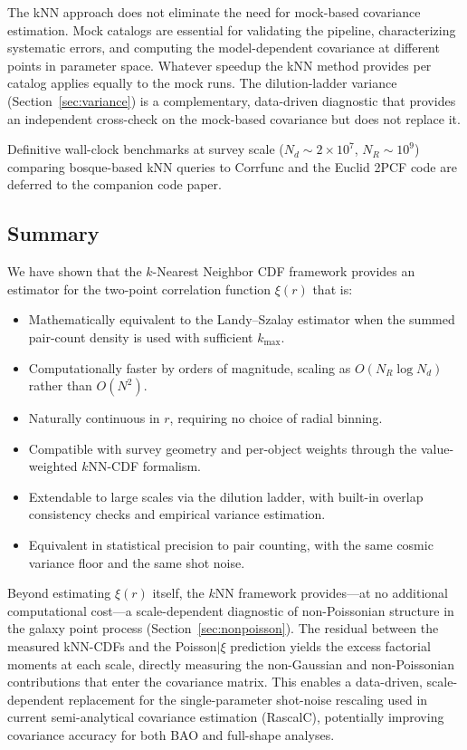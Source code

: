 The kNN approach does not eliminate the need for mock-based covariance estimation.  Mock catalogs are essential for validating the pipeline, characterizing systematic errors, and computing the model-dependent covariance at different points in parameter space.  Whatever speedup the kNN method provides per catalog applies equally to the mock runs.  The dilution-ladder variance (Section~\ref{sec:variance}) is a complementary, data-driven diagnostic that provides an independent cross-check on the mock-based covariance but does not replace it.

Definitive wall-clock benchmarks at survey scale ($N_d \sim 2 \times 10^7$, $N_R \sim 10^9$) comparing bosque-based kNN queries to Corrfunc and the Euclid 2PCF code are deferred to the companion code paper.

\subsection{Summary}
\label{sec:summary_final}

We have shown that the $k$-Nearest Neighbor CDF framework provides an estimator for the two-point correlation function $\xi(r)$ that is:
\begin{itemize}[nosep]
  \item Mathematically equivalent to the Landy--Szalay estimator when the summed pair-count density is used with sufficient $k_{\max}$.
  \item Computationally faster by orders of magnitude, scaling as $O(N_R \log N_d)$ rather than $O(N^2)$.
  \item Naturally continuous in $r$, requiring no choice of radial binning.
  \item Compatible with survey geometry and per-object weights through the value-weighted $k$NN-CDF formalism.
  \item Extendable to large scales via the dilution ladder, with built-in overlap consistency checks and empirical variance estimation.
  \item Equivalent in statistical precision to pair counting, with the same cosmic variance floor and the same shot noise.
\end{itemize}

Beyond estimating $\xi(r)$ itself, the $k$NN framework provides---at no additional computational cost---a scale-dependent diagnostic of non-Poissonian structure in the galaxy point process (Section~\ref{sec:nonpoisson}).  The residual between the measured kNN-CDFs and the Poisson$|\xi$ prediction yields the excess factorial moments at each scale, directly measuring the non-Gaussian and non-Poissonian contributions that enter the covariance matrix.  This enables a data-driven, scale-dependent replacement for the single-parameter shot-noise rescaling used in current semi-analytical covariance estimation (RascalC), potentially improving covariance accuracy for both BAO and full-shape analyses.

